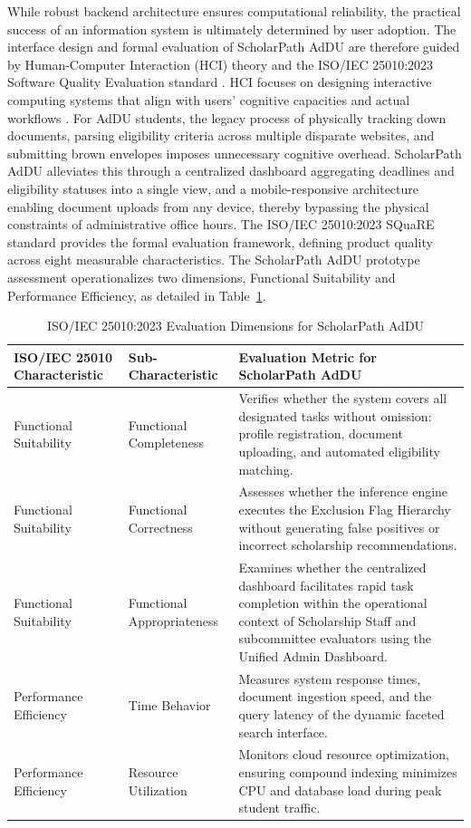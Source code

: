 While robust backend architecture ensures computational reliability, the practical success of an information system is ultimately determined by user adoption. The interface design and formal evaluation of ScholarPath AdDU are therefore guided by Human-Computer Interaction (HCI) theory and the ISO/IEC 25010:2023 Software Quality Evaluation standard \cite{ref23,ref31}. HCI focuses on designing interactive computing systems that align with users' cognitive capacities and actual workflows \cite{ref23}. For AdDU students, the legacy process of physically tracking down documents, parsing eligibility criteria across multiple disparate websites, and submitting brown envelopes imposes unnecessary cognitive overhead. ScholarPath AdDU alleviates this through a centralized dashboard aggregating deadlines and eligibility statuses into a single view, and a mobile-responsive architecture enabling document uploads from any device, thereby bypassing the physical constraints of administrative office hours. The ISO/IEC 25010:2023 SQuaRE standard provides the formal evaluation framework, defining product quality across eight measurable characteristics. The ScholarPath AdDU prototype assessment operationalizes two dimensions, Functional Suitability and Performance Efficiency, as detailed in Table~\ref{tab:iso25010}. \begin{table}[htbp]
  \centering
  \small
  \caption{ISO/IEC 25010:2023 Evaluation Dimensions for ScholarPath AdDU}
  \label{tab:iso25010}
  \begin{tabular}{@{}p{3.2cm} p{3.0cm} p{7.6cm}@{}}
    \toprule
    ISO/IEC 25010 Characteristic & Sub-Characteristic & Evaluation Metric for ScholarPath AdDU \\
    \midrule
    Functional Suitability & Functional Completeness & Verifies whether the system covers all designated tasks without omission: profile registration, document uploading, and automated eligibility matching. \\
    \addlinespace
    Functional Suitability & Functional Correctness & Assesses whether the inference engine executes the Exclusion Flag Hierarchy without generating false positives or incorrect scholarship recommendations. \\
    \addlinespace
    Functional Suitability & Functional Appropriateness & Examines whether the centralized dashboard facilitates rapid task completion within the operational context of Scholarship Staff and subcommittee evaluators using the Unified Admin Dashboard. \\
    \addlinespace
    Performance Efficiency & Time Behavior & Measures system response times, document ingestion speed, and the query latency of the dynamic faceted search interface. \\
    \addlinespace
    Performance Efficiency & Resource Utilization & Monitors cloud resource optimization, ensuring compound indexing minimizes CPU and database load during peak student traffic. \\
    \bottomrule
  \end{tabular}
\end{table}
